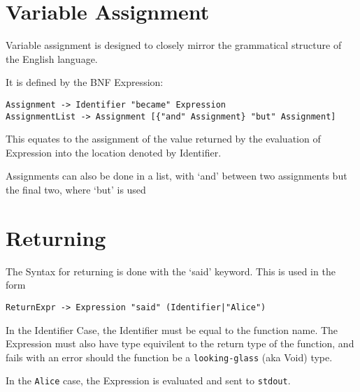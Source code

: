 \documentclass[a4wide, 11pt]{article}
\begin{document}
\section{Variable Assignment}

Variable assignment is designed to closely mirror the grammatical structure of the English language.

It is defined by the BNF Expression:

\begin{verbatim}
Assignment -> Identifier "became" Expression
AssignmentList -> Assignment [{"and" Assignment} "but" Assignment]
\end{verbatim}

This equates to the assignment of the value returned by the evaluation of Expression into the location denoted by Identifier.

Assignments can also be done in a list, with `and' between two assignments but the final two, where `but' is used

\section {Returning}

The Syntax for returning is done with the `said' keyword. This is used in the form
\begin{verbatim}
ReturnExpr -> Expression "said" (Identifier|"Alice")
\end{verbatim}
In the Identifier Case, the Identifier must be equal to the function name. The Expression must also have type equivilent to the return type of the function, and fails with an error should the function be a \texttt{looking-glass} (aka Void) type.

In the \texttt{Alice} case, the Expression is evaluated and sent to \texttt{stdout}.
\end{document}
